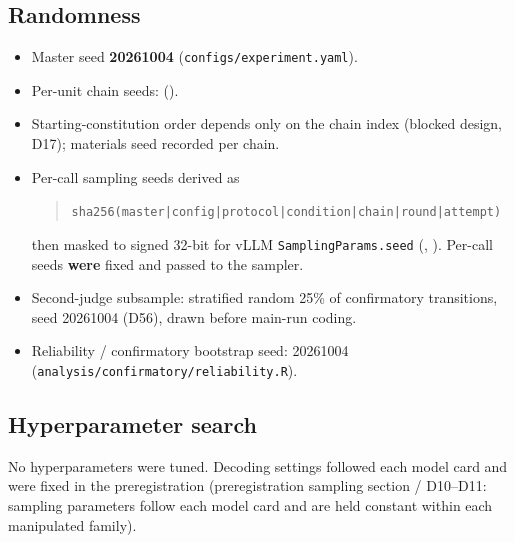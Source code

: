 \subsection{Randomness}
\begin{itemize}
\item Master seed \textbf{20261004} (\texttt{configs/experiment.yaml}).
\item Per-unit chain seeds:  ().
\item Starting-constitution order depends only on the chain index (blocked design, D17); materials seed recorded per chain.
\item Per-call sampling seeds derived as
\begin{quote}
\texttt{sha256(master|config|protocol|condition|chain|round|attempt)}
\end{quote}
\noindent then masked to signed 32-bit for vLLM \texttt{SamplingParams.seed} (, ). Per-call seeds \textbf{were} fixed and passed to the sampler.
\item Second-judge subsample: stratified random 25\% of confirmatory transitions, seed 20261004 (D56), drawn before main-run coding.
\item Reliability / confirmatory bootstrap seed: 20261004 (\texttt{analysis/confirmatory/reliability.R}).
\end{itemize}

\subsection{Hyperparameter search}
No hyperparameters were tuned. Decoding settings followed each model card and were fixed in the preregistration (preregistration sampling section / D10--D11: sampling parameters follow each model card and are held constant within each manipulated family).
